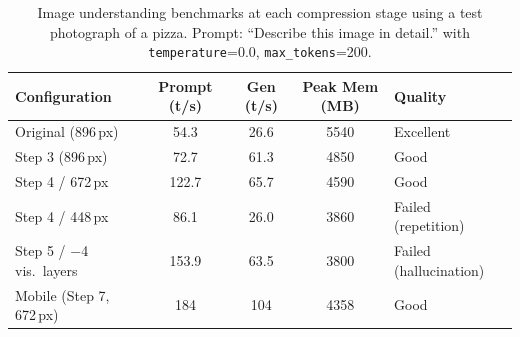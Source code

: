 \documentclass[11pt]{article}
\begin{document}
\begin{table}[h]
\centering
\caption{Image understanding benchmarks at each compression stage using a test photograph of a pizza. Prompt: ``Describe this image in detail.'' with \texttt{temperature}=0.0, \texttt{max\_tokens}=200.}
\label{tab:detailed_benchmarks}
\begin{tabular}{@{}lcccl@{}}
\toprule
Configuration & Prompt (t/s) & Gen (t/s) & Peak Mem (MB) & Quality \\
\midrule
Original (896\,px) & 54.3 & 26.6 & 5540 & Excellent \\
Step 3 (896\,px) & 72.7 & 61.3 & 4850 & Good \\
Step 4 / 672\,px & 122.7 & 65.7 & 4590 & Good \\
Step 4 / 448\,px & 86.1 & 26.0 & 3860 & Failed (repetition) \\
Step 5 / $-$4 vis.\ layers & 153.9 & 63.5 & 3800 & Failed (hallucination) \\
Mobile (Step 7, 672\,px) & 184 & 104 & 4358 & Good \\
\bottomrule
\end{tabular}
\end{table}
\end{document}
